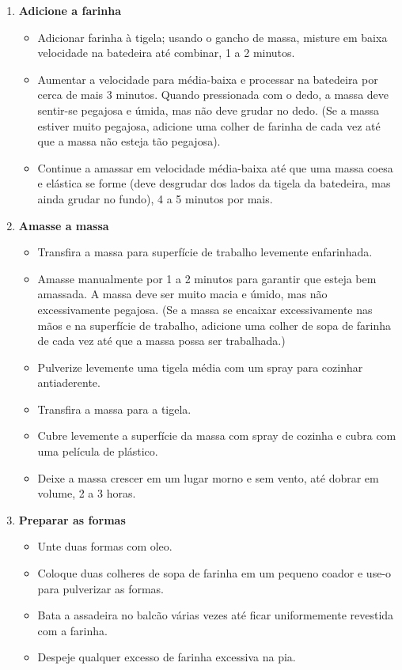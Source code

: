\documentclass [11pt, papel de carta] {article}
\begin{document}
\begin {description}
\begin {enumerate}
\item {\bf Adicione a farinha}
\begin {itemize}
\item Adicionar farinha à tigela; usando o gancho de massa, misture em baixa velocidade na batedeira até combinar, 1 a 2 minutos.
\item Aumentar a velocidade para média-baixa e processar na batedeira por cerca de mais 3 minutos. Quando pressionada com o dedo, a massa deve sentir-se pegajosa e úmida, mas não deve grudar
no dedo. (Se a massa estiver muito pegajosa, adicione uma colher de farinha de cada vez at\'e que a massa n\~ao esteja t\~ao pegajosa). 
\item Continue a amassar em velocidade média-baixa até que uma massa coesa e elástica
se forme (deve desgrudar dos lados da tigela da batedeira, mas ainda grudar no fundo), 4 a 5 minutos por mais.
\end {itemize}

\item {\bf Amasse a massa}
\begin {itemize}
\item Transfira a massa para superfície de trabalho levemente enfarinhada.
\item Amasse manualmente por 1 a 2 minutos para garantir que esteja bem amassada. A massa
deve ser muito macia e úmido, mas não excessivamente pegajosa. (Se a massa se encaixar excessivamente nas mãos e na superfície de trabalho, adicione uma colher de sopa de farinha de cada vez até que a massa possa ser trabalhada.)
\item Pulverize levemente uma tigela média com um spray para cozinhar antiaderente.
\item Transfira a massa para a tigela.
\item Cubre levemente a superfície da massa com spray de cozinha e cubra com uma película de plástico.
\item Deixe a massa crescer em um lugar morno e sem vento, até dobrar em volume, 2 a 3 horas.
\end {itemize}

\item {\bf Preparar as formas}
\begin {itemize}
\item Unte duas formas com oleo.
\item Coloque duas colheres de sopa de farinha em um  pequeno coador e use-o para pulverizar as formas.
\item Bata a assadeira no balcão várias vezes até ficar uniformemente revestida com a farinha.
\item Despeje qualquer excesso de farinha excessiva na pia.
\end {itemize}


\end{enumerate}
\end{description}
\end{document}
